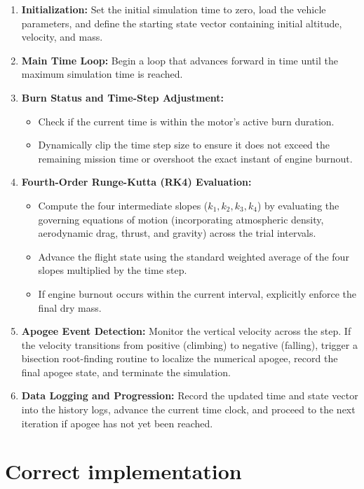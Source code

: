 \documentclass{article}
\begin{document}
\begin{enumerate}
    \item \textbf{Initialization:} Set the initial simulation time to zero, load the vehicle parameters, and define the starting state vector containing initial altitude, velocity, and mass.
    \item \textbf{Main Time Loop:} Begin a loop that advances forward in time until the maximum simulation time is reached.
    \item \textbf{Burn Status and Time-Step Adjustment:} 
    \begin{itemize}
        \item Check if the current time is within the motor's active burn duration.
        \item Dynamically clip the time step size to ensure it does not exceed the remaining mission time or overshoot the exact instant of engine burnout.
    \end{itemize}
    \item \textbf{Fourth-Order Runge-Kutta (RK4) Evaluation:} 
    \begin{itemize}
        \item Compute the four intermediate slopes ($k_1, k_2, k_3, k_4$) by evaluating the governing equations of motion (incorporating atmospheric density, aerodynamic drag, thrust, and gravity) across the trial intervals.
        \item Advance the flight state using the standard weighted average of the four slopes multiplied by the time step.
        \item If engine burnout occurs within the current interval, explicitly enforce the final dry mass.
    \end{itemize}
    \item \textbf{Apogee Event Detection:} Monitor the vertical velocity across the step. If the velocity transitions from positive (climbing) to negative (falling), trigger a bisection root-finding routine to localize the numerical apogee, record the final apogee state, and terminate the simulation.
    \item \textbf{Data Logging and Progression:} Record the updated time and state vector into the history logs, advance the current time clock, and proceed to the next iteration if apogee has not yet been reached.
\end{enumerate}

\section{Correct implementation}
\end{document}
